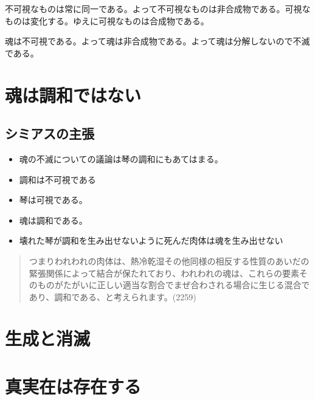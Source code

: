 \documentclass[a4j,11pt]{jarticle}
\begin{document}
不可視なものは常に同一である。よって不可視なものは非合成物である。可視なものは変化する。ゆえに可視なものは合成物である。

魂は不可視である。よって魂は非合成物である。よって魂は分解しないので不滅である。

\section{魂は調和ではない}
\subsection{シミアスの主張}
\begin{itemize}
    \item 魂の不滅についての議論は琴の調和にもあてはまる。
    \item 調和は不可視である
    \item 琴は可視である。
    \item 魂は調和である。
    \item 壊れた琴が調和を生み出せないように死んだ肉体は魂を生み出せない
\end{itemize}

\begin{quote}    
    つまりわれわれの肉体は、熱冷乾湿その他同様の相反する性質のあいだの緊張関係によって結合が保たれており、われわれの魂は、これらの要素そのものがたがいに正しい適当な割合でまぜ合わされる場合に生じる混合であり、調和である、と考えられます。(2259)
\end{quote}

\section{生成と消滅}

\section{真実在は存在する}
\end{document}
